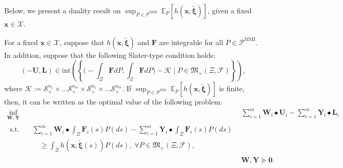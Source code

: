 \documentclass[final,onefignum,onetabnum]{class}
\newcommand{\ee}[2]{\mathbb{E}_{#1} \left[ #2 \right]}
\newcommand{\bs}[1]{\boldsymbol{#1}} %
\newcommand{\Cs}[1]{\mathcal{#1}} %
\newcommand{\Fs}[1]{\mathfrak{#1}} %
\newcommand{\txi}{\tilde{\bs{\xi}}}
\newcommand{\M}{\Fs{M}_{+}(\Xi,\Cs{F})}
\newcommand{\inte}[1]{\text{int}\left(#1\right)}
\newcommand{\st}{\text{s.t.}}
\begin{document}
Below, we present a duality result on $\sup_{P \in \Cs{P}^{\text{MMI}}} \ \ee{P}{h(\bs{x},\txi)}$, given a fixed $\bs{x} \in \Cs{X}$. 
\begin{theorem}
    \label{thm: rev.dual_MMI}
    For a fixed $\bs{x} \in \Cs{X}$, suppose that $h(\bs{x},\txi)$ and $\bs{F}$ are integrable for all $P \in \Cs{P}^{\text{MMI}}$. 
    In addition, suppose that the following Slater-type condition holds:
    $$(-\bs{U}, \bs{L}) \in \inte{\left \lbrace \Big(-\int_{\Xi} \bs{F} d P, \int_{\Xi} \bs{F} d P \Big) - \Cs{K} \; \Big| \; P \in \M\right \rbrace}, $$
    where $\Cs{K}:=\Cs{S}_{+}^{n_{1}} \times \ldots \Cs{S}_{+}^{n_{m}} \times \Cs{S}_{+}^{n_{1}} \times \ldots \Cs{S}_{+}^{n_{m}}$. 
    If $\sup_{P \in \Cs{P}^{\text{MM}}} \ \ee{P}{h(\bs{x},\txi)}$ is finite, then, it can be written  as the optimal value of the following problem:
    \begin{align*}
        \inf_{\bs{W},\bs{Y}} \ & \sum_{i=1}^{m}  \bs{W}_{i} \bullet  \bs{U}_{i}  -\sum_{i=1}^{m} \bs{Y}_{i} \bullet \bs{L}_{i}  \\
        \begin{split}
            \st \quad & \sum_{i=1}^{m}  \bs{W}_{i} \bullet \int_{\Xi} \bs{F}_{i}(s) P(ds)  - \sum_{i=1}^{m}  \bs{Y}_{i} \bullet \int_{\Xi} \bs{F}_{i}(s) P(ds)   \\ 
            & \quad {} \ge \int_{\Xi} h(\bs{x},\txi(s)) P(ds), \; \forall P \in \M, 
        \end{split}\\
        & \bs{W},\bs{Y} \succcurlyeq \bs{0}.
    \end{align*}
\end{theorem}
\end{document}

